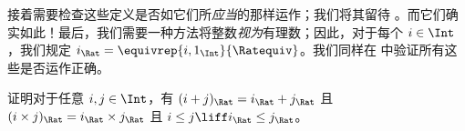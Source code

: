 \documentclass[../../../include/open-logic-section]{subfiles}
\begin{document}
接着需要检查这些定义是否如它们所\emph{应当}的那样运作；我们将其留待 。而它们确实如此！最后，我们需要一种方法将整数\emph{视为}有理数；因此，对于每个 $i \in \Int$，我们规定 $i_{\Rat} =
\equivrep{i, 1_{\Int}}{\Ratequiv}$。我们同样在  中验证所有这些是否运作正确。

\begin{prob}
证明对于任意 $i, j \in \Int$，有 $(i + j)_{\Rat} = i_{\Rat}+ j_{\Rat}$ 且 $(i \times j)_{\Rat} =
i_{\Rat} \times j_{\Rat}$ 且 $i \leq j \liff i_{\Rat} \leq j_{\Rat}$。
\end{prob}
\end{document}
